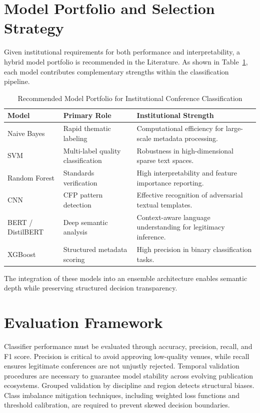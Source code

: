 \documentclass[11pt,a4paper]{article}
\begin{document}
\section{Model Portfolio and Selection Strategy}

Given institutional requirements for both performance and interpretability, a hybrid
model portfolio is recommended in the Literature. As shown in Table~\ref{tab:modelportfolio}, each model
contributes complementary strengths within the classification pipeline.

\begin{table}[h]
\centering
\caption{Recommended Model Portfolio for Institutional Conference Classification}
\label{tab:modelportfolio}
\begin{tabular}{@{}p{2.5cm}p{3.2cm}p{7.5cm}@{}}
\toprule
\textbf{Model} & \textbf{Primary Role} & \textbf{Institutional Strength} \\
\midrule
Naive Bayes & Rapid thematic labeling & Computational efficiency for large-scale metadata processing. \\
SVM & Multi-label quality classification & Robustness in high-dimensional sparse text spaces. \\
Random Forest & Standards verification & High interpretability and feature importance reporting. \\
CNN & CFP pattern detection & Effective recognition of adversarial textual templates. \\
BERT / DistilBERT & Deep semantic analysis & Context-aware language understanding for legitimacy inference. \\
XGBoost & Structured metadata scoring & High precision in binary classification tasks. \\
\bottomrule
\end{tabular}
\end{table}

The integration of these models into an ensemble architecture enables semantic depth
while preserving structured decision transparency.

\section{Evaluation Framework}

Classifier performance must be evaluated through accuracy, precision, recall,
and F1 score. Precision is critical to avoid approving low-quality venues,
while recall ensures legitimate conferences are not unjustly rejected.
Temporal validation procedures are necessary to guarantee model stability
across evolving publication ecosystems. Grouped validation by discipline
and region detects structural biases. Class imbalance mitigation techniques,
including weighted loss functions and threshold calibration, are required
to prevent skewed decision boundaries.
\end{document}
